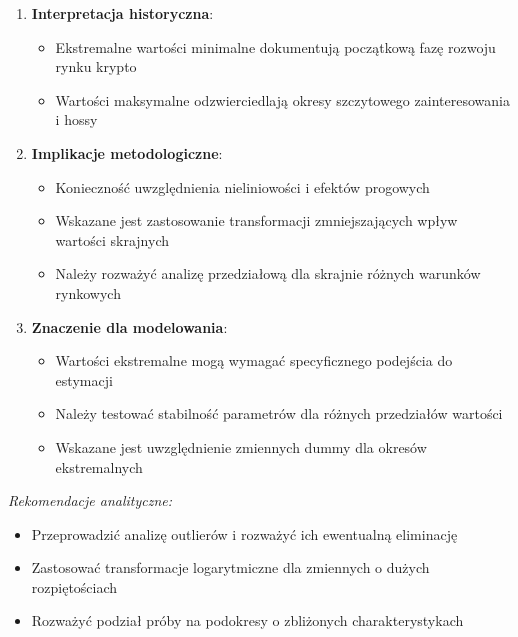 \documentclass[
  11pt,
]{article}
\providecommand{\tightlist}{%
  \setlength{\itemsep}{0pt}\setlength{\parskip}{0pt}}
\begin{document}
\begin{enumerate}
\def\labelenumi{\arabic{enumi}.}
\tightlist
\item
  \textbf{Interpretacja historyczna}: \vspace{0.2cm}

  \begin{itemize}
  \tightlist
  \item
    Ekstremalne wartości minimalne dokumentują początkową fazę rozwoju
    rynku krypto
  \item
    Wartości maksymalne odzwierciedlają okresy szczytowego
    zainteresowania i hossy
  \end{itemize}
\item
  \textbf{Implikacje metodologiczne}: \vspace{0.2cm}

  \begin{itemize}
  \tightlist
  \item
    Konieczność uwzględnienia nieliniowości i efektów progowych
  \item
    Wskazane jest zastosowanie transformacji zmniejszających wpływ
    wartości skrajnych
  \item
    Należy rozważyć analizę przedziałową dla skrajnie różnych warunków
    rynkowych
  \end{itemize}
\item
  \textbf{Znaczenie dla modelowania}: \vspace{0.2cm}

  \begin{itemize}
  \tightlist
  \item
    Wartości ekstremalne mogą wymagać specyficznego podejścia do
    estymacji
  \item
    Należy testować stabilność parametrów dla różnych przedziałów
    wartości
  \item
    Wskazane jest uwzględnienie zmiennych dummy dla okresów
    ekstremalnych
  \end{itemize}
\end{enumerate}

\vspace{0.3cm}

\textit{Rekomendacje analityczne:}

\begin{itemize}
\item Przeprowadzić analizę outlierów i rozważyć ich ewentualną eliminację
\item Zastosować transformacje logarytmiczne dla zmiennych o dużych rozpiętościach
\item Rozważyć podział próby na podokresy o zbliżonych charakterystykach
\end{itemize}
\end{document}
